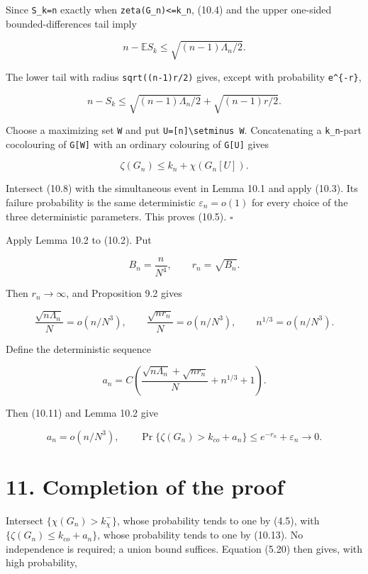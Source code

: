 \documentclass[
  11pt,
  a4paper,
]{article}
\begin{document}
Since \texttt{S\_k=n} exactly when \texttt{zeta(G\_n)\textless{}=k\_n},
(10.4) and the upper one-sided bounded-differences tail imply

\[
 n-\mathbb ES_k\le\sqrt{(n-1)\Lambda_n/2}.               \tag{10.7}
\]

The lower tail with radius \texttt{sqrt((n-1)r/2)} gives, except with
probability \texttt{e\^{}\{-r\}},

\[
 n-S_k\le
 \sqrt{(n-1)\Lambda_n/2}+\sqrt{(n-1)r/2}.                \tag{10.8}
\]

Choose a maximizing set \texttt{W} and put
\texttt{U={[}n{]}\textbackslash{}setminus\ W}. Concatenating a
\texttt{k\_n}-part cocolouring of \texttt{G{[}W{]}} with an ordinary
colouring of \texttt{G{[}U{]}} gives

\[
 \zeta(G_n)\le k_n+\chi(G_n[U]).                         \tag{10.9}
\]

Intersect (10.8) with the simultaneous event in Lemma 10.1 and apply
(10.3). Its failure probability is the same deterministic
\(\varepsilon_n=o(1)\) for every choice of the three deterministic
parameters. This proves (10.5). \(\square\)

Apply Lemma 10.2 to (10.2). Put

\[
 B_n=\frac n{N^4},\qquad r_n=\sqrt{B_n}.                 \tag{10.10}
\]

Then \(r_n\to\infty\), and Proposition 9.2 gives

\[
 \frac{\sqrt{n\Lambda_n}}N=o(n/N^3),\qquad
 \frac{\sqrt{nr_n}}N=o(n/N^3),\qquad
 n^{1/3}=o(n/N^3).                                       \tag{10.11}
\]

Define the deterministic sequence

\[
 a_n=C\left(
 \frac{\sqrt{n\Lambda_n}+\sqrt{nr_n}}N+n^{1/3}+1\right).
                                                               \tag{10.12}
\]

Then (10.11) and Lemma 10.2 give

\[
 a_n=o(n/N^3),\qquad
 \Pr\{\zeta(G_n)>k_{co}+a_n\}
 \le e^{-r_n}+\varepsilon_n\longrightarrow0.            \tag{10.13}
\]

\section{11. Completion of the proof}\label{completion-of-the-proof}

Intersect \(\{\chi(G_n)>k_\chi^-\}\), whose probability tends to one by
(4.5), with \(\{\zeta(G_n)\le k_{co}+a_n\}\), whose probability tends to
one by (10.13). No independence is required; a union bound suffices.
Equation (5.20) then gives, with high probability,
\end{document}
